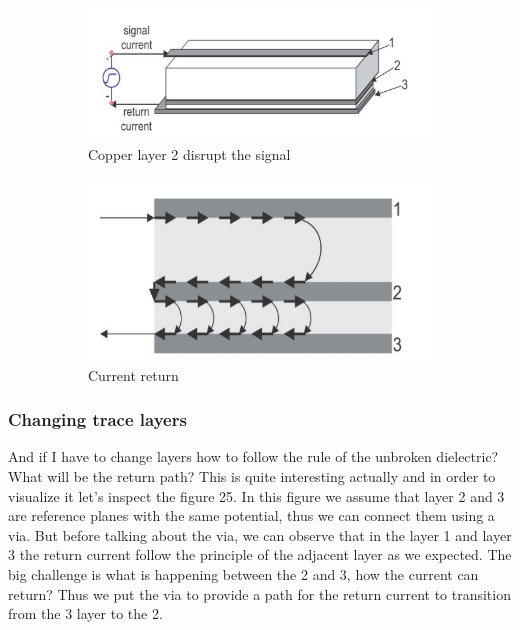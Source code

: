 \documentclass[final]{cubedoc}
\begin{document}
	\begin{figure}[h!]
		\centering
		\begin{subfigure}{.4\textwidth}
			\centering
			\includegraphics[keepaspectratio, height=0.2\textheight, width=\textwidth]{assets/broken_dielectric.png}
			\caption{Copper layer 2 disrupt the signal \cite{bogatin2009signal}}
		\end{subfigure}
		\begin{subfigure}{.4\textwidth}
			\centering
			\includegraphics[keepaspectratio, height=0.2\textheight, width=\textwidth]{assets/side_current.png}
			\caption{Current return \cite{bogatin2009signal}}
		\end{subfigure}
		\caption{}
	\end{figure}
	
	\subsubsection{Changing trace layers}
	
	And if I have to change layers how to follow the rule of the unbroken dielectric? What will be the return path? This is quite interesting actually and in order to visualize it let's inspect the figure 25.	In this figure we assume that layer 2 and 3 are reference planes with the same potential, thus we can connect them using a via. But before talking about the via, we can observe that in the layer 1 and layer 3 the return current follow the principle of the adjacent layer as we expected. The big challenge is what is happening between the 2 and 3, how the current can return? Thus we put the via to provide a path for the return current to transition from the 3 layer to the 2.
	
\end{document}
